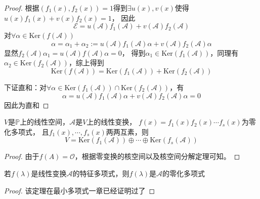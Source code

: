 \begin{proof}
  根据$(f_1(x),f_2(x)) = 1$得到$\exists u(x),v(x)$使得$u(x)f_1(x) + v(x)f_2(x) = 1$，
  因此
  \begin{equation*}
    \mathcal{E} = u(\mathcal{A})f_1(\mathcal{A}) + v(\mathcal{A}) f_2(\mathcal{A})
  \end{equation*}
  对$\forall \alpha \in \mathrm{Ker}(f(\mathcal{A}))$
  \begin{equation*}
    \alpha = \alpha_1 + \alpha _2 := u(\mathcal{A})f_1(\mathcal{A})\alpha + v(\mathcal{A})f_2(\mathcal{A})\alpha
  \end{equation*}
  显然$f_2(\mathcal{A})\alpha_1 = u(\mathcal{A})f(\mathcal{A})\alpha = 0$，
  得到$\alpha_1 \in \mathrm{Ker}(f_1(\mathcal{A}))$，同理有$\alpha_2 \in \mathrm{Ker}(f_2(\mathcal{A}))$，综上得到
  \begin{equation*}
    \mathrm{Ker}(f(\mathcal{A})) = \mathrm{Ker}(f_1(\mathcal{A})) + \mathrm{Ker}(f_2(\mathcal{A}))
  \end{equation*}

  下证直和：对$\forall \alpha \in \mathrm{Ker}(f_1(\mathcal{A})) \cap \mathrm{Ker}(f_2(\mathcal{A}))$，有
  \begin{equation*}
    \alpha = u(\mathcal{A})f_1(\mathcal{A})\alpha + v(\mathcal{A})f_2(\mathcal{A})\alpha = 0
  \end{equation*}
  因此为直和
\end{proof}

\begin{theorem}
  $V$是$\mathbb{P}$上的线性空间，$\mathcal{A}$是$V$上的线性变换，
  $f(x) = f_1(x) f_2(x) \cdots f_s(x)$为零化多项式，
  且$f_1(x),\cdots,f_s(x)$两两互素，则
  \begin{equation*}
    V = \mathrm{Ker}(f_1(\mathcal{A})) \oplus \cdots \oplus \mathrm{Ker}(f_s(\mathcal{A}))
  \end{equation*}
\end{theorem}

\begin{proof}
  由于$f(A) = \mathcal{O}$，根据零变换的核空间以及核空间分解定理可知。
\end{proof}


\begin{lemma}
  若$f(\lambda)$是线性变换$\mathcal{A}$的特征多项式，则$f(\lambda)$是$\mathcal{A}$的零化多项式
\end{lemma}

\begin{proof}
  该定理在最小多项式一章已经证明过了
\end{proof}

